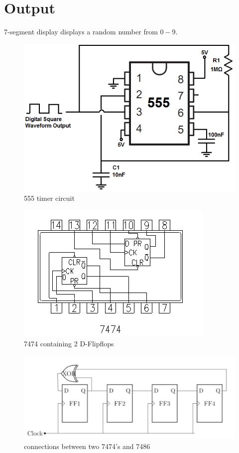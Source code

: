 \documentclass[12pt, journal]{IEEEtran}
\begin{document}
	\section*{Output}
	7-segment display displays a random number from $0-9$.\\
	\begin{figure}[h]
		\includegraphics[width=\linewidth]{img/555.png}
		\caption{ 555 timer circuit}
		\label{fig-1}
	\end{figure}
	\begin{figure}[ht]
		\includegraphics[width=\linewidth]{img/IC7474.png}
		\caption{ 7474 containing 2 D-Flipflops}
		\label{fig-2}
	\end{figure}
	\begin{figure}[ht]
		\includegraphics[width=\linewidth]{img/circuit.jpg}
		\caption{ connections between two 7474's and 7486}
		\label{fig-3}
	\end{figure}
\end{document}
